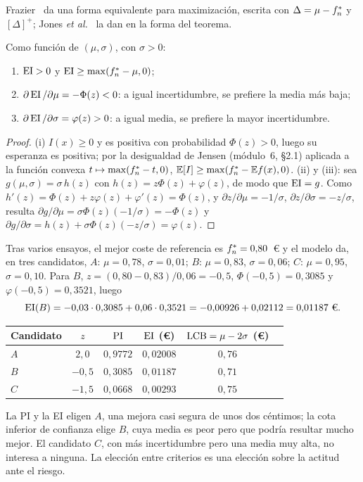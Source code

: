 Frazier~\cite[ec.~(8)]{frazier} da una forma equivalente para maximización, escrita con $\Delta=\mu-f^{*}_{n}$ y $[\Delta]^+$; Jones \emph{et al.}~\cite[ec.~(15)]{jones} la dan en la forma del teorema.

\begin{proposicion}\label{prop:ei}
Como función de $(\mu,\sigma)$, con $\sigma>0$:
\begin{enumerate}
  \item $\operatorname{EI}>0$ y $\operatorname{EI}\ge\max(f^{*}_{n}-\mu,0)$;
  \item $\partial\operatorname{EI}/\partial\mu=-\Phi(z)<0$: a igual incertidumbre, se prefiere la media más baja;
  \item $\partial\operatorname{EI}/\partial\sigma=\varphi(z)>0$: a igual media, se prefiere la mayor incertidumbre.
\end{enumerate}
\end{proposicion}

\begin{proof}
(i) $I(x)\ge 0$ y es positiva con probabilidad $\Phi(z)>0$, luego su esperanza es positiva; por la desigualdad de Jensen (módulo~6, §2.1) aplicada a la función convexa $t\mapsto\max(f^{*}_{n}-t,0)$, $\mathbb{E}[I]\ge\max(f^{*}_{n}-\mathbb{E} f(x),0)$. (ii) y (iii): sea $g(\mu,\sigma)=\sigma\,h(z)$ con $h(z)=z\Phi(z)+\varphi(z)$, de modo que $\operatorname{EI}=g$. Como $h'(z)=\Phi(z)+z\varphi(z)+\varphi'(z)=\Phi(z)$, y $\partial z/\partial\mu=-1/\sigma$, $\partial z/\partial\sigma=-z/\sigma$, resulta $\partial g/\partial\mu=\sigma\Phi(z)(-1/\sigma)=-\Phi(z)$ y $\partial g/\partial\sigma=h(z)+\sigma\Phi(z)(-z/\sigma)=\varphi(z)$.
\end{proof}

\begin{ejemplo}\label{ej:ei}
Tras varios ensayos, el mejor coste de referencia es $f^{*}_{n}=0{,}80$~€ y el modelo da, en tres candidatos, $A$: $\mu=0{,}78$, $\sigma=0{,}01$; $B$: $\mu=0{,}83$, $\sigma=0{,}06$; $C$: $\mu=0{,}95$, $\sigma=0{,}10$. Para $B$, $z=(0{,}80-0{,}83)/0{,}06=-0{,}5$, $\Phi(-0{,}5)=0{,}3085$ y $\varphi(-0{,}5)=0{,}3521$, luego
\[
\EI(B)=-0{,}03\cdot0{,}3085+0{,}06\cdot0{,}3521=-0{,}00926+0{,}02112=0{,}01187\ \text{€}.
\]
\begin{center}\small
\begin{tabular}{@{}lccccc@{}}
\toprule
Candidato & $z$ & $\operatorname{PI}$ & $\operatorname{EI}$ (€) & $\operatorname{LCB}=\mu-2\sigma$ (€) \\
\midrule
$A$ & $2{,}0$ & $0{,}9772$ & $0{,}02008$ & $0{,}76$ \\
$B$ & $-0{,}5$ & $0{,}3085$ & $0{,}01187$ & $0{,}71$ \\
$C$ & $-1{,}5$ & $0{,}0668$ & $0{,}00293$ & $0{,}75$ \\
\bottomrule
\end{tabular}
\end{center}
La PI y la EI eligen $A$, una mejora casi segura de unos dos céntimos; la cota inferior de confianza elige $B$, cuya media es peor pero que podría resultar mucho mejor. El candidato $C$, con más incertidumbre pero una media muy alta, no interesa a ninguna. La elección entre criterios es una elección sobre la actitud ante el riesgo.
\end{ejemplo}

